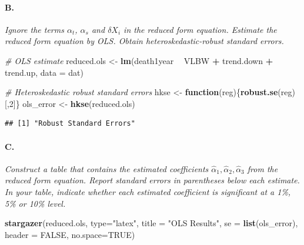 \documentclass[
]{article}
\newenvironment{Shaded}{\begin{snugshade}}{\end{snugshade}}
\newcommand{\CommentTok}[1]{\textcolor[rgb]{0.56,0.35,0.01}{\textit{#1}}}
\newcommand{\ControlFlowTok}[1]{\textcolor[rgb]{0.13,0.29,0.53}{\textbf{#1}}}
\newcommand{\DataTypeTok}[1]{\textcolor[rgb]{0.13,0.29,0.53}{#1}}
\newcommand{\DecValTok}[1]{\textcolor[rgb]{0.00,0.00,0.81}{#1}}
\newcommand{\KeywordTok}[1]{\textcolor[rgb]{0.13,0.29,0.53}{\textbf{#1}}}
\newcommand{\NormalTok}[1]{#1}
\newcommand{\OperatorTok}[1]{\textcolor[rgb]{0.81,0.36,0.00}{\textbf{#1}}}
\newcommand{\OtherTok}[1]{\textcolor[rgb]{0.56,0.35,0.01}{#1}}
\newcommand{\StringTok}[1]{\textcolor[rgb]{0.31,0.60,0.02}{#1}}
\begin{document}
\hypertarget{b.-3}{%
\paragraph{B.}\label{b.-3}}

\textit{Ignore the terms $\alpha _t$, $\alpha_s$ and $\delta X_i$ in the reduced form equation. Estimate the reduced form equation by OLS. Obtain heteroskedastic-robust standard errors.}

\begin{Shaded}
\begin{Highlighting}[]
\CommentTok{# OLS estimate}
\NormalTok{reduced.ols <-}\StringTok{ }\KeywordTok{lm}\NormalTok{(death1year }\OperatorTok{~}\StringTok{ }\NormalTok{VLBW }\OperatorTok{+}\StringTok{ }\NormalTok{trend.down }\OperatorTok{+}\StringTok{ }\NormalTok{trend.up, }\DataTypeTok{data =}\NormalTok{ dat)}
\end{Highlighting}
\end{Shaded}

\begin{Shaded}
\begin{Highlighting}[]
\CommentTok{# Heteroskedastic robust standard errors }
\NormalTok{hkse <-}\StringTok{ }\ControlFlowTok{function}\NormalTok{(reg)\{}\KeywordTok{robust.se}\NormalTok{(reg)[,}\DecValTok{2}\NormalTok{]\}}
\NormalTok{ols_error <-}\StringTok{ }\KeywordTok{hkse}\NormalTok{(reduced.ols)}
\end{Highlighting}
\end{Shaded}

\begin{verbatim}
## [1] "Robust Standard Errors"
\end{verbatim}

\hypertarget{c.-2}{%
\paragraph{C.}\label{c.-2}}

\emph{Construct a table that contains the estimated coefficients
\(\hat{\alpha}_1, \hat{\alpha}_2, \hat{\alpha}_3\) from the reduced form
equation. Report standard errors in parentheses below each estimate. In
your table, indicate whether each estimated coefficient is significant
at a 1\%, 5\% or 10\% level.}

\begin{Shaded}
\begin{Highlighting}[]
\KeywordTok{stargazer}\NormalTok{(reduced.ols, }\DataTypeTok{type=}\StringTok{"latex"}\NormalTok{, }\DataTypeTok{title =} \StringTok{"OLS Results"}\NormalTok{, }
          \DataTypeTok{se =} \KeywordTok{list}\NormalTok{(ols_error), }\DataTypeTok{header =} \OtherTok{FALSE}\NormalTok{, }\DataTypeTok{no.space=}\OtherTok{TRUE}\NormalTok{)}
\end{Highlighting}
\end{Shaded}
\end{document}
